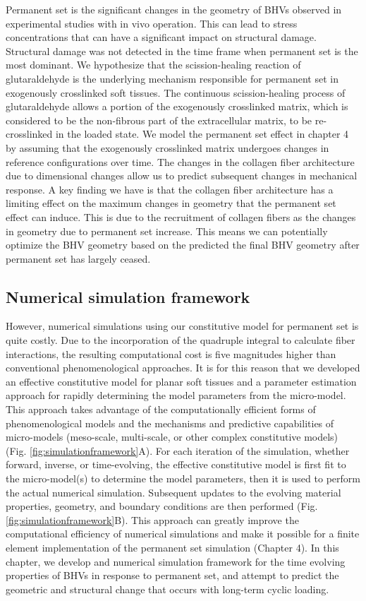     
    Permanent set is the significant changes in the geometry of BHVs observed in experimental studies \cite{smith_fatigue_1999}\cite{smith_high_1997} with in vivo operation. This can lead to stress concentrations that can have a significant impact on structural damage. Structural damage was not detected in the time frame when permanent set is the most dominant. We hypothesize that the scission-healing reaction of glutaraldehyde is the underlying mechanism responsible for permanent set in exogenously crosslinked soft tissues. The continuous scission-healing process of glutaraldehyde allows a portion of the exogenously crosslinked matrix, which is considered to be the non-fibrous part of the extracellular matrix, to be re-crosslinked in the loaded state. We model the permanent set effect in chapter 4 by assuming that the exogenously crosslinked matrix undergoes changes in reference configurations over time. The changes in the collagen fiber architecture due to dimensional changes allow us to predict subsequent changes in mechanical response. A key finding we have is that the collagen fiber architecture has a limiting effect on the maximum changes in geometry that the permanent set effect can induce. This is due to the recruitment of collagen fibers as the changes in geometry due to permanent set increase. This means we can potentially optimize the BHV geometry based on the predicted the final BHV geometry after permanent set has largely ceased. 
    

\subsection{Numerical simulation framework}

    However, numerical simulations using our constitutive model for permanent set is quite costly. Due to the incorporation of the quadruple integral to calculate fiber interactions, the resulting computational cost is five magnitudes higher than conventional phenomenological approaches. It is for this reason that we developed an effective constitutive model for planar soft tissues and a parameter estimation approach for rapidly determining the model parameters from the micro-model. This approach takes advantage of the computationally efficient forms of phenomenological models and the mechanisms and predictive capabilities of micro-models (meso-scale, multi-scale, or other complex constitutive models) (Fig. \ref{fig:simulationframework}A). For each iteration of the simulation, whether forward, inverse, or time-evolving, the effective constitutive model is first fit to the micro-model(s) to determine the model parameters, then it is used to perform the actual numerical simulation. Subsequent updates to the evolving material properties, geometry, and boundary conditions are then performed (Fig. \ref{fig:simulationframework}B). This approach can greatly improve the computational efficiency of numerical simulations and make it possible for a finite element implementation of the permanent set simulation (Chapter 4). In this chapter, we develop and numerical simulation framework for the time evolving properties of BHVs in response to permanent set, and attempt to predict the geometric and structural change that occurs with long-term cyclic loading. 
    
